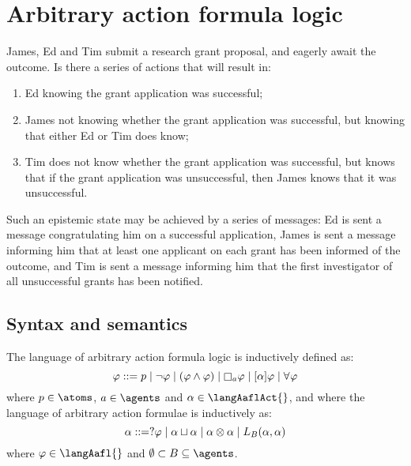 \chapter{Arbitrary action formula logic}\label{aafl}

\begin{example}\label{grant-example}
James, Ed and Tim submit a research grant proposal, and eagerly await the outcome.
Is there a series of actions that will result in: 

\begin{enumerate}
  \item Ed knowing the grant application was successful; 
  \item James not knowing whether the grant application was successful, but knowing that either Ed or Tim does know;
  \item Tim does not know whether the grant application was successful, but knows that if the grant application was unsuccessful, then James knows that it was unsuccessful.
\end{enumerate}

Such an epistemic state may be achieved by a series of messages: Ed is sent a message congratulating him on a successful application, James is sent a message informing him that at least one applicant on each grant has been informed of the outcome, and Tim is sent a message informing him that the first investigator of all unsuccessful grants has been notified.
\end{example}

\section{Syntax and semantics}\label{aafl-semantics}

\begin{definition}
The language \langAafl{} of arbitrary action formula logic is inductively defined as:
$$
    \phi ::= \atomP \mid 
           \neg \phi \mid
           (\phi \land \phi) \mid
           \necessaryA \phi \mid
           \actionA{\alpha} \phi \mid
           \allrefs \phi
$$
where $\atomP \in \atoms$, $\agentA \in \agents$ and $\alpha \in \langAaflAct{}$, and where the language \langAaflAct{} of arbitrary action formulae is inductively as:
$$
    \alpha ::= ?{\varphi} \mid
           \alpha \sqcup \alpha \mid
           \alpha \otimes \alpha \mid
           {L_{B}} (\alpha, \alpha)
$$
where $\phi \in \langAafl{}$ and $\emptyset \subset \agentsB \subseteq \agents$.
\end{definition}

